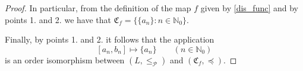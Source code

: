 \documentclass[10pt,a4paper]{amsart}
\begin{document}
\begin{proof}
\noindent In particular, from the definition of the map $f$ given by \eqref{dis_func} and by points 1. and 2. we have that
$
\mathfrak{C}_f=
\{\{a_n\}:n\in\mathbb{N}_0\}
$.

\noindent Finally, by points 1. and 2. it follows that the application
$$
[a_n,b_n]\mapsto \{a_n\} \qquad (n\in\mathbb{N}_0)
$$
is an order isomorphism between $(L,\le_\mathcal{P})$ and $(\mathfrak{C}_f,\preceq)$.
\end{proof}
\end{document}
